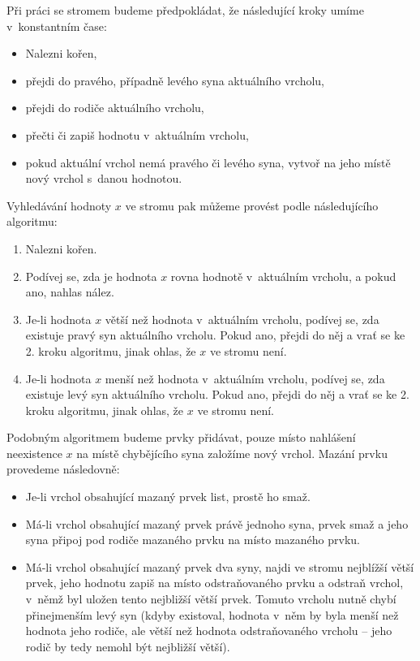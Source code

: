Při práci se stromem budeme předpokládat, že následující kroky umíme v~konstantním čase:
\begin{itemize}
\item Nalezni kořen,
\item přejdi do pravého, případně levého syna aktuálního vrcholu,
\item přejdi do rodiče aktuálního vrcholu,
\item přečti či zapiš hodnotu v~aktuálním vrcholu,
\item pokud aktuální vrchol nemá pravého či levého syna, vytvoř na jeho místě nový vrchol s~danou hodnotou.
\end{itemize}
Vyhledávání hodnoty $x$ ve stromu pak můžeme provést podle následujícího algoritmu:
\begin{enumerate}
\item Nalezni kořen.
\item Podívej se, zda je hodnota $x$ rovna hodnotě v~aktuálním vrcholu, a pokud ano, nahlas nález.
\item Je-li hodnota $x$ větší než hodnota v~aktuálním vrcholu, podívej se, zda existuje pravý syn aktuálního vrcholu. Pokud ano, přejdi do něj a vrať se ke 2. kroku algoritmu, jinak ohlas, že  $x$ ve stromu není.
\item Je-li hodnota $x$ menší než hodnota v~aktuálním vrcholu, podívej se, zda existuje levý syn aktuálního vrcholu. Pokud ano, přejdi do něj a vrať se ke 2. kroku algoritmu, jinak ohlas, že  $x$ ve stromu není.
\end{enumerate}

Podobným algoritmem budeme prvky přidávat, pouze místo nahlášení neexistence $x$ na místě chybějícího syna založíme nový vrchol. Mazání prvku provedeme následovně:

\begin{itemize}
\item Je-li vrchol obsahující mazaný prvek list, prostě ho smaž.
\item Má-li vrchol obsahující mazaný prvek právě jednoho syna, prvek smaž a jeho syna připoj pod rodiče mazaného prvku na místo mazaného prvku.
\item Má-li vrchol obsahující mazaný prvek dva syny, najdi ve stromu nejblížší větší prvek, jeho
hodnotu zapiš na místo odstraňovaného prvku a odstraň vrchol, v~němž byl uložen tento nejbližší větší
prvek. Tomuto vrcholu nutně chybí přinejmenším levý syn (kdyby existoval, hodnota
v~něm by byla menší než hodnota jeho rodiče, ale větší než hodnota odstraňovaného
vrcholu -- jeho rodič by tedy nemohl být nejbližší větší).  
\end{itemize} 

